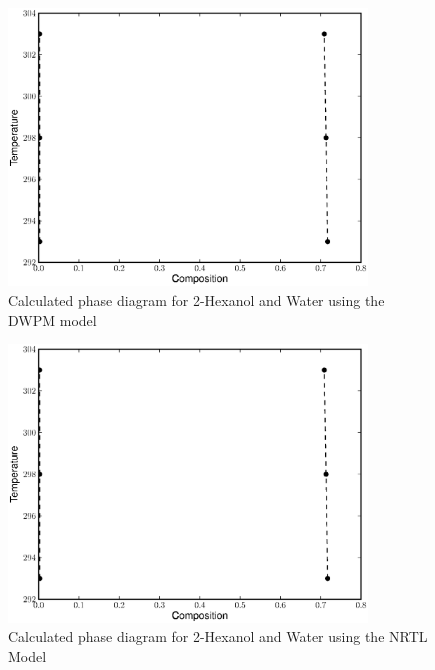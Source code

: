 \begin{figure}[hp]
\centering
\includegraphics[width = 0.85\textwidth]{Results_Parts/BinaryParams/2-hexanol-water/DWPM/PhaseDiagram.eps}
\caption{Calculated phase diagram for 2-Hexanol and Water using the DWPM model} \label{DWPM2-hexanol-water}
\end{figure}

\begin{figure}[hp]
\centering
\includegraphics[width = 0.85\textwidth]{Results_Parts/BinaryParams/2-hexanol-water/NRTL/PhaseDiagram.eps}
\caption{Calculated phase diagram for 2-Hexanol and Water using the NRTL Model} \label{NRTL2-hexanol-water}
\end{figure}	

